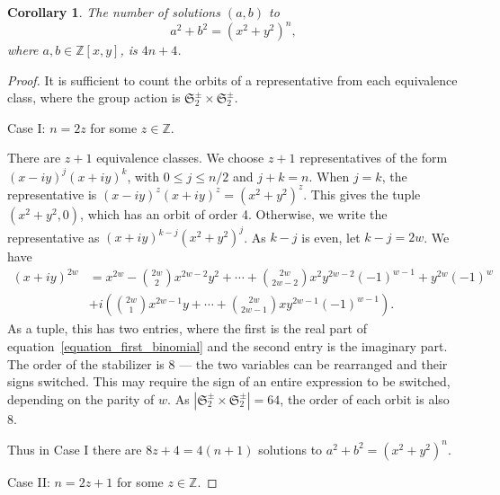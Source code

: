 \documentclass[12pt,table]{article}
\newtheorem{corollary}[theorem]{Corollary}
\theoremstyle{definition}
\theoremstyle{remark}
\newcommand{\Zzz}{\mathbb Z}
\newcommand{\myfrac}[2]{#1 / #2}
\numberwithin{equation}{section}
\begin{document}
\begin{corollary}

The number of solutions $ (a, b) $ to
\[
a^2 + b^2 = (x^2 + y^2)^n,
\]
where $ a, b \in \Zzz[x,y] $, is $4n + 4$.

\end{corollary}
\begin{proof}
It is sufficient to count the orbits of a representative from each
equivalence class, where the group action is
$ \mathfrak{S}_2^\pm \times \mathfrak{S}_2^\pm $.

\noindent
Case I: $ n = 2z $ for some $ z \in \Zzz $.

There are $ z + 1 $ equivalence classes. We choose $ z + 1 $
representatives of the form $ (x - iy)^j (x + iy)^k $, with
$ 0 \leq j \leq \myfrac{n}{2}$ and $ j + k = n $.
When $ j = k $, the representative
is $ (x - iy)^z (x + iy)^z = ( x^2 + y^2 ) ^ z $.
This gives the tuple $ ( x^2 + y^2, 0 ) $, which has an orbit of order 4.
Otherwise, we write the representative as $ (x + iy)^{k-j} (x^2 + y^2)^j $.
As $ k - j $ is even, let $ k - j = 2w $. We have
\begin{align}
\label{equation_first_binomial}
(x + iy) ^ {2w} &= x ^ {2w} - \binom{2w}{2}  x^{2w - 2 } y^2
+ \dotsb + \binom{2w}{2w-2} x^2 y^{2w - 2} (-1) ^ {w - 1}
+  y^{2w} (-1) ^ {w} \nonumber
\\
&+ i \left( \binom{2w}{1} x ^ {2w - 1} y + \dotsb +
\binom{2w}{2w-1}  x y ^ {2w -1} (-1)^{w-1} \right).
\end{align}
As a tuple, this has two entries, where the first is the real part
of equation~\eqref{equation_first_binomial} and the second entry
is the imaginary part.
The order of the stabilizer is 8 --- the two variables can be rearranged and their
signs switched. This may require the sign of an entire expression to be switched,
depending on the parity of $ w $.
As $ | \mathfrak{S}_2^\pm \times \mathfrak{S}_2^\pm | = 64$, the order of each orbit
is also 8. 

Thus in Case I there are $ 8z + 4 = 4 (n + 1 ) $ solutions
to $ a^2 + b^2 = (x^2 + y^2)^n $.



\noindent
Case II: $ n = 2z + 1$ for some $ z \in \Zzz $.


\end{proof}
\end{document}
